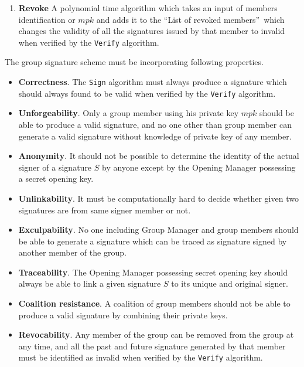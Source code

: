 \begin{definition}
\begin{enumerate}
\item \textbf{Revoke} A polynomial time algorithm which takes an input of members identification or $mpk$ and adds it to the \textquotedblleft List of revoked members\textquotedblright ~which changes the validity of all the signatures issued by that member to invalid when verified by the \texttt{Verify} algorithm.
\end{enumerate}
\end{definition}

The group signature scheme must be incorporating following properties.

\begin{itemize}
\item \textbf{Correctness}.  The \texttt{Sign} algorithm must always produce a signature which should always found to be valid when verified by the \texttt{Verify} algorithm.

\item \textbf{Unforgeability}. Only a group member using his private key $mpk$ should be able to produce a valid signature, and no one other than group member can generate a valid signature without knowledge of private key of any member.

\item \textbf{Anonymity}. It should not be possible to determine the identity of the actual signer of a signature $S$ by anyone except by the Opening Manager possessing a secret opening key.

\item \textbf{Unlinkability}. It must be computationally hard to decide whether given two signatures are from same signer member or not.

\item \textbf{Exculpability}. No one including Group Manager and group members should be able to generate a signature which can be traced as signature signed by another member of the group.

\item \textbf{Traceability}. The Opening Manager possessing secret opening key should always be able to link a given signature $S$ to its unique and original signer.

\item \textbf{Coalition resistance}. A coalition of group members should not be able to produce a valid signature by combining their private keys.

\item \textbf{Revocability}. Any member of the group can be removed from the group at any time, and all the past and future signature generated by that member must be identified as invalid when verified by the \texttt{Verify} algorithm.
\end{itemize}

